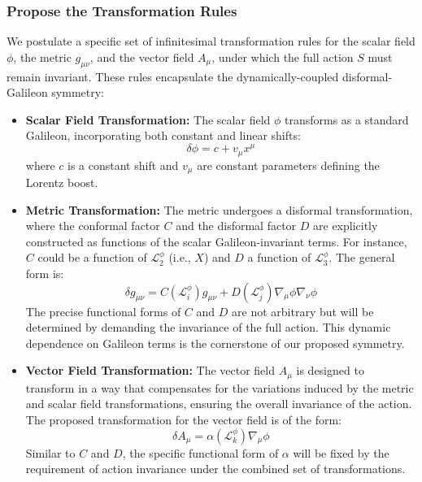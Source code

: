 \documentclass[twocolumn]{aastex631}
\begin{document}
\subsubsection{Propose the Transformation Rules}
We postulate a specific set of infinitesimal transformation rules for the scalar field $\phi$, the metric $g_{\mu\nu}$, and the vector field $A_\mu$, under which the full action $S$ must remain invariant. These rules encapsulate the dynamically-coupled disformal-Galileon symmetry:
\begin{itemize}
    \item \textbf{Scalar Field Transformation:} The scalar field $\phi$ transforms as a standard Galileon, incorporating both constant and linear shifts:
    $$
    \delta \phi = c + v_\mu x^\mu
    $$
    where $c$ is a constant shift and $v_\mu$ are constant parameters defining the Lorentz boost.
    \item \textbf{Metric Transformation:} The metric undergoes a disformal transformation, where the conformal factor $C$ and the disformal factor $D$ are explicitly constructed as functions of the scalar Galileon-invariant terms. For instance, $C$ could be a function of $\mathcal{L}_2^\phi$ (i.e., $X$) and $D$ a function of $\mathcal{L}_3^\phi$. The general form is:
    $$
    \delta g_{\mu\nu} = C(\mathcal{L}_i^\phi) g_{\mu\nu} + D(\mathcal{L}_j^\phi) \nabla_\mu \phi \nabla_\nu \phi
    $$
    The precise functional forms of $C$ and $D$ are not arbitrary but will be determined by demanding the invariance of the full action. This dynamic dependence on Galileon terms is the cornerstone of our proposed symmetry.
    \item \textbf{Vector Field Transformation:} The vector field $A_\mu$ is designed to transform in a way that compensates for the variations induced by the metric and scalar field transformations, ensuring the overall invariance of the action. The proposed transformation for the vector field is of the form:
    $$
    \delta A_\mu = \alpha(\mathcal{L}_k^\phi) \nabla_\mu \phi
    $$
    Similar to $C$ and $D$, the specific functional form of $\alpha$ will be fixed by the requirement of action invariance under the combined set of transformations.
\end{itemize}
\end{document}
